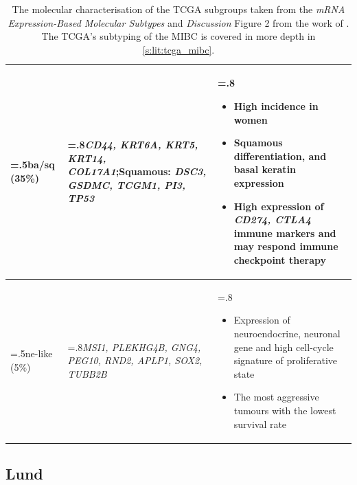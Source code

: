 \begin{table}[H]
\begin{tabularx}{\textwidth}{ >{\hsize=.5\hsize}X |>{\hsize=.8\hsize}X |>{\hsize=.8\hsize}X
    }
    \acrlong{ba/sq}  (35\%) &\textit{CD44, KRT6A, KRT5, KRT14, COL17A1};Squamous: \textit{DSC3, GSDMC, TCGM1, PI3, TP53} & 
    \begin{itemize}[leftmargin=*, nosep, after=\vspace{-\baselineskip}, before=\vspace{-.6\baselineskip}]
        \item High incidence in women
        \item Squamous differentiation, and basal keratin expression
        \item High expression of \textit{CD274, CTLA4} immune markers and may respond immune checkpoint therapy
    \end{itemize} \\
    \midrule
    \acrlong{ne-like} (5\%) &\textit{MSI1, PLEKHG4B, GNG4, PEG10, RND2, APLP1, SOX2, TUBB2B} & 
    \begin{itemize}[leftmargin=*, nosep, after=\vspace{-\baselineskip}, before=\vspace{-.6\baselineskip}]
        \item Expression of neuroendocrine, neuronal gene and high cell-cycle signature of proliferative state
        \item The most aggressive tumours with the lowest survival rate
    \end{itemize} \\
    \bottomrule
    \end{tabularx}
    \caption[Summary table of the TCGA subtypes]{The molecular characterisation of the TCGA subgroups taken from the \textit{mRNA Expression-Based Molecular Subtypes} and \textit{Discussion} Figure 2 from the work of \cite{Robertson2017-mg}. The TCGA's subtyping of the MIBC is covered in more depth in \cref{s:lit:tcga_mibc}.}
    \label{tab:lit:tcga_genes}
\end{table}

\subsection{Lund}

